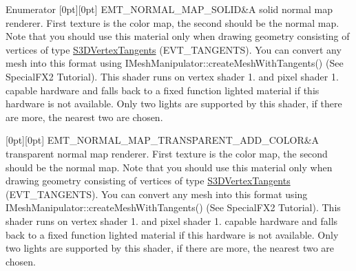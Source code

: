 \begin{DoxyEnumFields}{Enumerator}
[0pt][0pt]{}\mbox{\label{namespaceirr_1_1video_ac8e9b6c66f7cebabd1a6d30cbc5430f1a89220ece17ea7d54a530de9756734c70}} 
E\+M\+T\+\_\+\+N\+O\+R\+M\+A\+L\+\_\+\+M\+A\+P\+\_\+\+S\+O\+L\+ID&A solid normal map renderer. First texture is the color map, the second should be the normal map. Note that you should use this material only when drawing geometry consisting of vertices of type \hyperlink{structirr_1_1video_1_1S3DVertexTangents}{S3\+D\+Vertex\+Tangents} (E\+V\+T\+\_\+\+T\+A\+N\+G\+E\+N\+TS). You can convert any mesh into this format using I\+Mesh\+Manipulator\+::create\+Mesh\+With\+Tangents() (See Special\+F\+X2 Tutorial). This shader runs on vertex shader 1. and pixel shader 1. capable hardware and falls back to a fixed function lighted material if this hardware is not available. Only two lights are supported by this shader, if there are more, the nearest two are chosen. \\
\hline

[0pt][0pt]{}\mbox{\label{namespaceirr_1_1video_ac8e9b6c66f7cebabd1a6d30cbc5430f1a12323a7408cc28c4e57c4ae52758086c}} 
E\+M\+T\+\_\+\+N\+O\+R\+M\+A\+L\+\_\+\+M\+A\+P\+\_\+\+T\+R\+A\+N\+S\+P\+A\+R\+E\+N\+T\+\_\+\+A\+D\+D\+\_\+\+C\+O\+L\+OR&A transparent normal map renderer. First texture is the color map, the second should be the normal map. Note that you should use this material only when drawing geometry consisting of vertices of type \hyperlink{structirr_1_1video_1_1S3DVertexTangents}{S3\+D\+Vertex\+Tangents} (E\+V\+T\+\_\+\+T\+A\+N\+G\+E\+N\+TS). You can convert any mesh into this format using I\+Mesh\+Manipulator\+::create\+Mesh\+With\+Tangents() (See Special\+F\+X2 Tutorial). This shader runs on vertex shader 1. and pixel shader 1. capable hardware and falls back to a fixed function lighted material if this hardware is not available. Only two lights are supported by this shader, if there are more, the nearest two are chosen. \\
\hline


\end{DoxyEnumFields}
